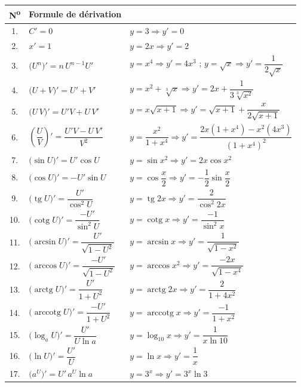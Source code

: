 \documentclass[11pt,a4paper]{article}
\newcommand{\tg}{\operatorname{tg}}
\newcommand{\cotg}{\operatorname{cotg}}
\newcommand{\arctg}{\operatorname{arctg}}
\newcommand{\arccotg}{\operatorname{arccotg}}
\begin{document}
\begin{center}
\renewcommand{\arraystretch}{2.0}
\small
\begin{tabular}{@{}c >{\centering\arraybackslash}m{4.7cm} >{\raggedright\arraybackslash}m{8.3cm}@{}}
\toprule
\rowcolor{primary!18}
\textbf{N\textsuperscript{o}} & \textbf{Formule de dérivation} & \multicolumn{1}{c}{\textbf{Application}}\\
\midrule
1. & $C'=0$ & $y=3\Rightarrow y'=0$\\ \hline
2. & $x'=1$ & $y=2x\Rightarrow y'=2$\\ \hline
3. & $\big(U^{n}\big)'=n\,U^{n-1}U'$ & $y=x^4\Rightarrow y'=4x^3$ \;;\; $y=\sqrt{x}\Rightarrow y'=\dfrac{1}{2\sqrt{x}}$\\ \hline
4. & $\big(U+V\big)'=U'+V'$ & $y=x^2+\sqrt[3]{x}\Rightarrow y'=2x+\dfrac{1}{3\sqrt[3]{x^2}}$\\ \hline
5. & $\big(U\,V\big)'=U'V+U\,V'$ & $y=x\sqrt{x+1}\Rightarrow y'=\sqrt{x+1}+\dfrac{x}{2\sqrt{x+1}}$\\ \hline
6. & $\left(\dfrac{U}{V}\right)'=\dfrac{U'V-U\,V'}{V^2}$ & $y=\dfrac{x^2}{1+x^4}\Rightarrow y'=\dfrac{2x(1+x^4)-x^2(4x^3)}{(1+x^4)^2}$\\ \hline
7. & $\big(\sin U\big)'=U'\cos U$ & $y=\sin x^2\Rightarrow y'=2x\cos x^2$\\ \hline
8. & $\big(\cos U\big)'=-U'\sin U$ & $y=\cos\dfrac{x}{2}\Rightarrow y'=-\dfrac12\sin\dfrac{x}{2}$\\ \hline
9. & $\big(\tg U\big)'=\dfrac{U'}{\cos^2 U}$ & $y=\tg 2x\Rightarrow y'=\dfrac{2}{\cos^2 2x}$\\ \hline
10. & $\big(\cotg U\big)'=\dfrac{-U'}{\sin^2 U}$ & $y=\cotg x\Rightarrow y'=\dfrac{-1}{\sin^2 x}$\\ \hline
11. & $\big(\arcsin U\big)'=\dfrac{U'}{\sqrt{1-U^2}}$ & $y=\arcsin x\Rightarrow y'=\dfrac{1}{\sqrt{1-x^2}}$\\ \hline
12. & $\big(\arccos U\big)'=\dfrac{-U'}{\sqrt{1-U^2}}$ & $y=\arccos x^2\Rightarrow y'=\dfrac{-2x}{\sqrt{1-x^4}}$\\ \hline
13. & $\big(\arctg U\big)'=\dfrac{U'}{1+U^2}$ & $y=\arctg 2x\Rightarrow y'=\dfrac{2}{1+4x^2}$\\ \hline
14. & $\big(\arccotg U\big)'=\dfrac{-U'}{1+U^2}$ & $y=\arccotg x\Rightarrow y'=\dfrac{-1}{1+x^2}$\\ \hline
15. & $\big(\log_a U\big)'=\dfrac{U'}{U\ln a}$ & $y=\log_{10} x\Rightarrow y'=\dfrac{1}{x\ln 10}$\\ \hline
16. & $\big(\ln U\big)'=\dfrac{U'}{U}$ & $y=\ln x\Rightarrow y'=\dfrac{1}{x}$\\ \hline
17. & $\big(a^{U}\big)'=U'\,a^{U}\ln a$ & $y=3^{x}\Rightarrow y'=3^{x}\ln 3$\\
\bottomrule
\end{tabular}
\renewcommand{\arraystretch}{1.0}
\end{center}
\end{document}
